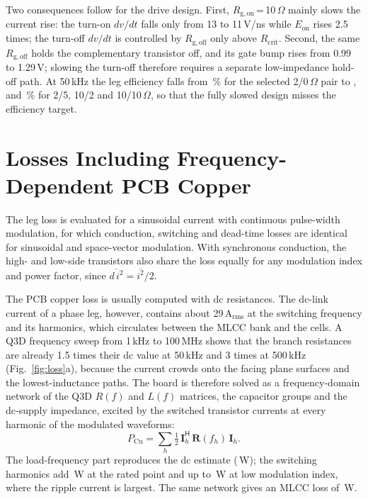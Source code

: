 \documentclass[conference]{IEEEtran}
\begin{document}
Two consequences follow for the drive design. First, $R_\mathrm{g,on}$\,=\,10\,$\Omega$ mainly slows the current rise: the turn-on $dv/dt$ falls only from 13 to 11\,V/ns while $E_\mathrm{on}$ rises 2.5 times; the turn-off $dv/dt$ is controlled by $R_\mathrm{g,off}$ only above $R_\mathrm{crit}$. Second, the same $R_\mathrm{g,off}$ holds the complementary transistor off, and its gate bump rises from 0.99 to 1.29\,V; slowing the turn-off therefore requires a separate low-impedance hold-off path. At 50\,kHz the leg efficiency falls from \SlEtaBase\,\% for the selected 2/0\,$\Omega$ pair to \SlEtaOffFive, \SlEtaOnTen{} and \SlEtaBoth\,\% for 2/5, 10/2 and 10/10\,$\Omega$, so that the fully slowed design misses the efficiency target.

\section{Losses Including Frequency-Dependent PCB Copper}\label{sec:loss}
The leg loss is evaluated for a sinusoidal current with continuous pulse-width modulation, for which conduction, switching and dead-time losses are identical for sinusoidal and space-vector modulation. With synchronous conduction, the high- and low-side transistors also share the loss equally for any modulation index and power factor, since $\overline{d\,i^2}=\overline{i^2}/2$.

The PCB copper loss is usually computed with dc resistances. The dc-link current of a phase leg, however, contains about 29\,A$_\mathrm{rms}$ at the switching frequency and its harmonics, which circulates between the MLCC bank and the cells. A Q3D frequency sweep from 1\,kHz to 100\,MHz shows that the branch resistances are already 1.5 times their dc value at 50\,kHz and 3 times at 500\,kHz (Fig.~\ref{fig:loss}a), because the current crowds onto the facing plane surfaces and the lowest-inductance paths. The board is therefore solved as a frequency-domain network of the Q3D $R(f)$ and $L(f)$ matrices, the capacitor groups and the dc-supply impedance, excited by the switched transistor currents at every harmonic of the modulated waveforms:
\begin{equation}
P_\mathrm{Cu}=\sum_h\tfrac12\,\mathbf I_h^\mathsf{H}\,\mathbf R(f_h)\,\mathbf I_h .
\end{equation}
The load-frequency part reproduces the dc estimate (\Pcu\,W); the switching harmonics add \PcuHf\,W at the rated point and up to \PcuHfLowM\,W at low modulation index, where the ripple current is largest. The same network gives an MLCC loss of \Pcap\,W.
\end{document}
